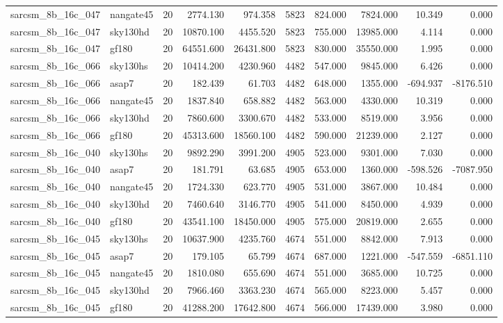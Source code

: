 \documentclass{article}
\begin{document}
\begin{longtable}{llrrrrrrrr}
sarcsm\_8b\_16c\_047 & nangate45 & 20 & 2774.130 & 974.358 & 5823 & 824.000 & 7824.000 & 10.349 & 0.000 \\
sarcsm\_8b\_16c\_047 & sky130hd & 20 & 10870.100 & 4455.520 & 5823 & 755.000 & 13985.000 & 4.114 & 0.000 \\
sarcsm\_8b\_16c\_047 & gf180 & 20 & 64551.600 & 26431.800 & 5823 & 830.000 & 35550.000 & 1.995 & 0.000 \\
sarcsm\_8b\_16c\_066 & sky130hs & 20 & 10414.200 & 4230.960 & 4482 & 547.000 & 9845.000 & 6.426 & 0.000 \\
sarcsm\_8b\_16c\_066 & asap7 & 20 & 182.439 & 61.703 & 4482 & 648.000 & 1355.000 & -694.937 & -8176.510 \\
sarcsm\_8b\_16c\_066 & nangate45 & 20 & 1837.840 & 658.882 & 4482 & 563.000 & 4330.000 & 10.319 & 0.000 \\
sarcsm\_8b\_16c\_066 & sky130hd & 20 & 7860.600 & 3300.670 & 4482 & 533.000 & 8519.000 & 3.956 & 0.000 \\
sarcsm\_8b\_16c\_066 & gf180 & 20 & 45313.600 & 18560.100 & 4482 & 590.000 & 21239.000 & 2.127 & 0.000 \\
sarcsm\_8b\_16c\_040 & sky130hs & 20 & 9892.290 & 3991.200 & 4905 & 523.000 & 9301.000 & 7.030 & 0.000 \\
sarcsm\_8b\_16c\_040 & asap7 & 20 & 181.791 & 63.685 & 4905 & 653.000 & 1360.000 & -598.526 & -7087.950 \\
sarcsm\_8b\_16c\_040 & nangate45 & 20 & 1724.330 & 623.770 & 4905 & 531.000 & 3867.000 & 10.484 & 0.000 \\
sarcsm\_8b\_16c\_040 & sky130hd & 20 & 7460.640 & 3146.770 & 4905 & 541.000 & 8450.000 & 4.939 & 0.000 \\
sarcsm\_8b\_16c\_040 & gf180 & 20 & 43541.100 & 18450.000 & 4905 & 575.000 & 20819.000 & 2.655 & 0.000 \\
sarcsm\_8b\_16c\_045 & sky130hs & 20 & 10637.900 & 4235.760 & 4674 & 551.000 & 8842.000 & 7.913 & 0.000 \\
sarcsm\_8b\_16c\_045 & asap7 & 20 & 179.105 & 65.799 & 4674 & 687.000 & 1221.000 & -547.559 & -6851.110 \\
sarcsm\_8b\_16c\_045 & nangate45 & 20 & 1810.080 & 655.690 & 4674 & 551.000 & 3685.000 & 10.725 & 0.000 \\
sarcsm\_8b\_16c\_045 & sky130hd & 20 & 7966.460 & 3363.230 & 4674 & 565.000 & 8223.000 & 5.457 & 0.000 \\
sarcsm\_8b\_16c\_045 & gf180 & 20 & 41288.200 & 17642.800 & 4674 & 566.000 & 17439.000 & 3.980 & 0.000 \\

\end{longtable}
\end{document}
